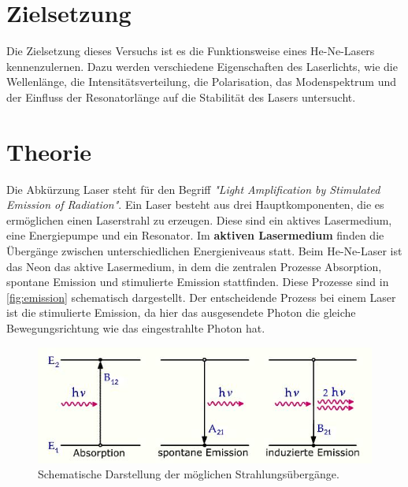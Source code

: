 \section*{Zielsetzung}
Die Zielsetzung dieses Versuchs ist es die Funktionsweise eines He-Ne-Lasers kennenzulernen. Dazu werden verschiedene Eigenschaften des Laserlichts, wie die Wellenlänge, die Intensitätsverteilung, die Polarisation, das Modenspektrum und der Einfluss der Resonatorlänge auf die Stabilität des Lasers untersucht.

\section{Theorie}
\label{sec:Theorie}

Die Abkürzung Laser steht für den Begriff \textit{"Light Amplification by Stimulated Emission of Radiation"}.
Ein Laser besteht aus drei Hauptkomponenten, die es ermöglichen einen Laserstrahl zu erzeugen. Diese sind ein aktives Lasermedium, eine Energiepumpe und ein Resonator.
\newline
Im \textbf{aktiven Lasermedium} finden die Übergänge zwischen unterschiedlichen Energieniveaus statt. Beim He-Ne-Laser ist das Neon das aktive Lasermedium, in dem die zentralen Prozesse Absorption, spontane Emission und stimulierte Emission stattfinden. Diese Prozesse sind in \autoref{fig:emission} schematisch dargestellt. Der entscheidende Prozess bei einem Laser ist die stimulierte Emission, da hier das ausgesendete Photon die gleiche Bewegungsrichtung wie das eingestrahlte Photon hat.

\begin{figure}[H]
  \centering
  \includegraphics[width=1\textwidth]{images/emission.JPG}
  \caption{Schematische Darstellung der möglichen Strahlungsübergänge. \cite{emission}}
  \label{fig:emission}
\end{figure}


